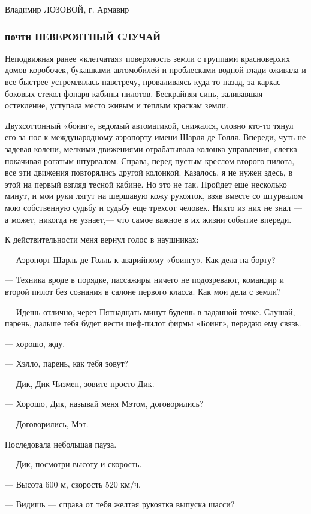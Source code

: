 \documentclass[11pt,a4paper,oneside]{article}
\begin{document}
Владимир ЛОЗОВОЙ, г. Армавир

\subsubsection{почти НЕВЕРОЯТНЫЙ СЛУЧАЙ}
Неподвижная ранее «клетчатая» поверхность земли с группами красноверхих домов-коробочек, букашками автомобилей и проблесками водной глади оживала и все быстрее устремлялась навстречу, проваливаясь куда-то назад, за каркас боковых стекол фонаря кабины пилотов. Бескрайняя синь, заливавшая остекление, уступала место живым и теплым краскам земли.

Двухсоттонный «боинг», ведомый автоматикой, снижался, словно кто-то тянул его за нос к международному аэропорту имени Шарля де Голля. Впереди, чуть не задевая колени, мелкими движениями отрабатывала колонка управления, слегка покачивая рогатым штурвалом. Справа, перед пустым креслом второго пилота, все эти движения повторялись другой колонкой. Казалось, я не нужен здесь, в этой на первый взгляд тесной кабине. Но это не так. Пройдет еще несколько минут, и мои руки лягут на шершавую кожу рукояток, взяв вместе со штурвалом мою собственную судьбу и судьбу еще трехсот человек. Никто из них не знал — а может, никогда не узнает,— что самое важное в их жизни событие впереди.

К действительности меня вернул голос в наушниках:

— Аэропорт Шарль де Голль к аварийному «боингу». Как дела на борту?

— Техника вроде в порядке, пассажиры ничего не подозревают, командир и второй пилот без сознания в салоне первого класса. Как мои дела с земли?

— Идешь отлично, через Пятнадцать минут будешь в заданной точке. Слушай, парень, дальше тебя будет вести шеф-пилот фирмы «Боинг», передаю ему связь.

— хорошо, жду.

— Хэлло, парень, как тебя зовут?

— Дик, Дик Чизмен, зовите просто Дик.

— Хорошо, Дик, называй меня Мэтом, договорились?

— Договорились, Мэт.

Последовала небольшая пауза.

— Дик, посмотри высоту и скорость.

— Высота 600 м, скорость 520 км/ч.

— Видишь — справа от тебя желтая рукоятка выпуска шасси?
\end{document}
